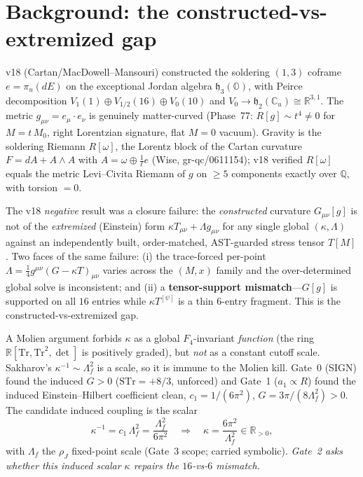 \documentclass[11pt]{article}
\newcommand{\Tr}{\mathrm{Tr}}
\newcommand{\STr}{\mathrm{STr}}
\newcommand{\h}{\mathfrak{h}}
\newcommand{\Oo}{\mathbb{O}}
\newcommand{\RR}{\mathbb{R}}
\newcommand{\QQ}{\mathbb{Q}}
\newcommand{\eu}{e}
\begin{document}
\section{Background: the constructed-vs-extremized gap}\label{sec:background}

v18 (Cartan/MacDowell--Mansouri) constructed the soldering $(1,3)$ coframe $\eu=\pi_u(dE)$ on
the exceptional Jordan algebra $\h_3(\Oo)$, with Peirce decomposition $V_1(1)\oplus
V_{1/2}(16)\oplus V_0(10)$ and $V_0\to\h_2(\mathbb{C}_u)\cong\RR^{3,1}$. The metric
$g_{\mu\nu}=\eu_\mu\cdot\eu_\nu$ is genuinely matter-curved (Phase~77: $R[g]\sim t^4\neq0$ for
$M=t\,M_0$, right Lorentzian signature, flat $M=0$ vacuum). Gravity is the soldering Riemann
$R[\omega]$, the Lorentz block of the Cartan curvature $F=dA+A\wedge A$ with $A=\omega\oplus
\tfrac{1}{\ell}\eu$ (Wise, gr-qc/0611154); v18 verified $R[\omega]$ equals the metric
Levi--Civita Riemann of $g$ on $\geq5$ components exactly over $\QQ$, with torsion $=0$.

The v18 \emph{negative} result was a closure failure: the \emph{constructed} curvature
$G_{\mu\nu}[g]$ is not of the \emph{extremized} (Einstein) form $\kappa T_{\mu\nu}+\Lambda
g_{\mu\nu}$ for any single global $(\kappa,\Lambda)$ against an independently built,
order-matched, AST-guarded stress tensor $T[M]$. Two faces of the same failure: (i) the
trace-forced per-point $\Lambda=\tfrac14 g^{\mu\nu}(G-\kappa T)_{\mu\nu}$ varies across the
$(M,x)$ family and the over-determined global solve is inconsistent; and (ii) a
\textbf{tensor-support mismatch}---$G[g]$ is supported on all $16$ entries while $\kappa
T^{[\psi]}$ is a thin $6$-entry fragment. This is the constructed-vs-extremized gap.

A Molien argument forbids $\kappa$ as a global $F_4$-invariant \emph{function} (the ring
$\RR[\Tr,\Tr^2,\det]$ is positively graded), but \emph{not} as a constant cutoff scale.
Sakharov's $\kappa^{-1}\sim\Lambda_f^2$ is a scale, so it is immune to the Molien kill. Gate~0
(SIGN) found the induced $G>0$ ($\STr=+8/3$, unforced) and Gate~1 ($a_1\propto R$) found the
induced Einstein--Hilbert coefficient clean, $c_1=1/(6\pi^2)$, $G=3\pi/(8\Lambda_f^2)>0$. The
candidate induced coupling is the scalar
\begin{equation}\label{eq:induced-kappa}
\kappa^{-1}=c_1\,\Lambda_f^2=\frac{\Lambda_f^2}{6\pi^2}
\quad\Longrightarrow\quad
\kappa=\frac{6\pi^2}{\Lambda_f^2}\in\RR_{>0},
\end{equation}
with $\Lambda_f$ the $\rho_J$ fixed-point scale (Gate~3 scope; carried symbolic). \emph{Gate~2
asks whether this induced scalar $\kappa$ repairs the $16$-vs-$6$ mismatch.}
\end{document}
